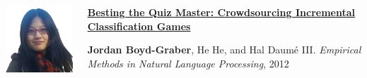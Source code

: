 \documentclass[compress]{beamer}
\begin{document}
\begin{frame}{}

  \begin{columns}
        \includegraphics[width=0.7\linewidth]{general_figures/hehe}
        \begin{block}{{\bf
              \href{http://cs.colorado.edu/~jbg//docs/qb_emnlp_2012.pdf}{Besting
                the Quiz Master: Crowdsourcing Incremental
                Classification Games}}}

          {\bf Jordan Boyd-Graber}, He He, and Hal {Daum\'{e} III}. \emph{Empirical Methods in Natural Language Processing}, 2012
        \end{block}

  \end{columns}
\end{frame}
\end{document}
